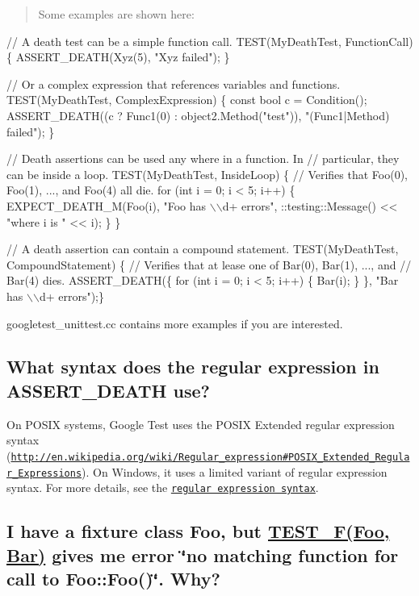 \begin{quote}
Some examples are shown here\+: \end{quote}



\begin{DoxyCode}
// A death test can be a simple function call.
TEST(MyDeathTest, FunctionCall) \{
  ASSERT\_DEATH(Xyz(5), "Xyz failed");
\}

// Or a complex expression that references variables and functions.
TEST(MyDeathTest, ComplexExpression) \{
  const bool c = Condition();
  ASSERT\_DEATH((c ? Func1(0) : object2.Method("test")),
               "(Func1|Method) failed");
\}

// Death assertions can be used any where in a function. In
// particular, they can be inside a loop.
TEST(MyDeathTest, InsideLoop) \{
  // Verifies that Foo(0), Foo(1), ..., and Foo(4) all die.
  for (int i = 0; i < 5; i++) \{
    EXPECT\_DEATH\_M(Foo(i), "Foo has \(\backslash\)\(\backslash\)d+ errors",
                   ::testing::Message() << "where i is " << i);
  \}
\}

// A death assertion can contain a compound statement.
TEST(MyDeathTest, CompoundStatement) \{
  // Verifies that at lease one of Bar(0), Bar(1), ..., and
  // Bar(4) dies.
  ASSERT\_DEATH(\{
    for (int i = 0; i < 5; i++) \{
      Bar(i);
    \}
  \},
  "Bar has \(\backslash\)\(\backslash\)d+ errors");\}
\end{DoxyCode}


{\ttfamily googletest\+\_\+unittest.\+cc} contains more examples if you are interested.

\subsection*{What syntax does the regular expression in A\+S\+S\+E\+R\+T\+\_\+\+D\+E\+A\+TH use?}

On P\+O\+S\+IX systems, Google Test uses the P\+O\+S\+IX Extended regular expression syntax (\href{http://en.wikipedia.org/wiki/Regular_expression#POSIX_Extended_Regular_Expressions}{\tt http\+://en.\+wikipedia.\+org/wiki/\+Regular\+\_\+expression\#\+P\+O\+S\+I\+X\+\_\+\+Extended\+\_\+\+Regular\+\_\+\+Expressions}). On Windows, it uses a limited variant of regular expression syntax. For more details, see the \href{V1_7_AdvancedGuide.md#Regular_Expression_Syntax}{\tt regular expression syntax}.

\subsection*{I have a fixture class Foo, but \hyperlink{gtest_8h_a0ee66d464d1a06c20c1929cae09d8758}{T\+E\+S\+T\+\_\+\+F(\+Foo, Bar)} gives me error \char`\"{}no matching function for call to Foo\+::\+Foo()\char`\"{}. Why?}

